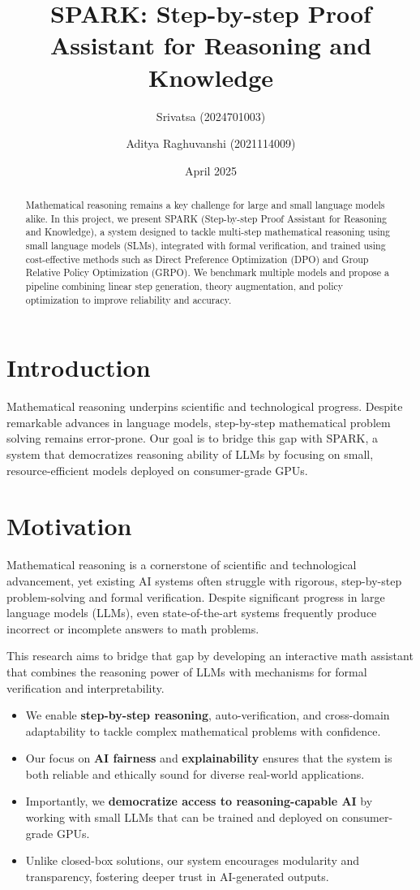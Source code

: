 \documentclass[11pt]{article}
\title{SPARK: Step-by-step Proof Assistant for Reasoning and Knowledge}
\author{Srivatsa (2024701003) \and Aditya Raghuvanshi (2021114009)}
\date{April 2025}
\begin{document}
\maketitle

\begin{abstract}
Mathematical reasoning remains a key challenge for large and small language models alike. In this project, we present SPARK (Step-by-step Proof Assistant for Reasoning and Knowledge), a system designed to tackle multi-step mathematical reasoning using small language models (SLMs), integrated with formal verification, and trained using cost-effective methods such as Direct Preference Optimization (DPO) and Group Relative Policy Optimization (GRPO). We benchmark multiple models and propose a pipeline combining linear step generation, theory augmentation, and policy optimization to improve reliability and accuracy.
\end{abstract}

\section{Introduction}
Mathematical reasoning underpins scientific and technological progress. Despite remarkable advances in language models, step-by-step mathematical problem solving remains error-prone. Our goal is to bridge this gap with SPARK, a system that democratizes reasoning ability of LLMs by focusing on small, resource-efficient models deployed on consumer-grade GPUs.

\section{Motivation}

Mathematical reasoning is a cornerstone of scientific and technological advancement, yet existing AI systems often struggle with rigorous, step-by-step problem-solving and formal verification. Despite significant progress in large language models (LLMs), even state-of-the-art systems frequently produce incorrect or incomplete answers to math problems.

This research aims to bridge that gap by developing an interactive math assistant that combines the reasoning power of LLMs with mechanisms for formal verification and interpretability.

\begin{itemize}
    \item We enable \textbf{step-by-step reasoning}, auto-verification, and cross-domain adaptability to tackle complex mathematical problems with confidence.
    \item Our focus on \textbf{AI fairness} and \textbf{explainability} ensures that the system is both reliable and ethically sound for diverse real-world applications.
    \item Importantly, we \textbf{democratize access to reasoning-capable AI} by working with small LLMs that can be trained and deployed on consumer-grade GPUs.
    \item Unlike closed-box solutions, our system encourages modularity and transparency, fostering deeper trust in AI-generated outputs.
\end{itemize}
\end{document}

